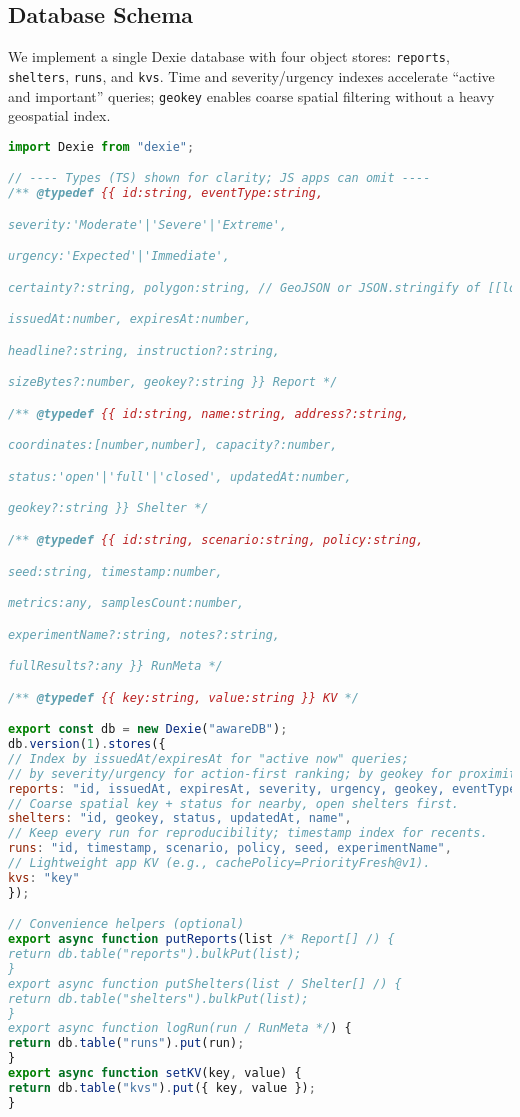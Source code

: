 \documentclass[11pt,twocolumn]{article}
\begin{document}
\subsection{Database Schema}
We implement a single Dexie database with four object stores: \texttt{reports}, \texttt{shelters}, \texttt{runs}, and \texttt{kvs}. Time and severity/urgency indexes accelerate “active and important” queries; \texttt{geokey} enables coarse spatial filtering without a heavy geospatial index.

\begin{lstlisting}[language=JavaScript, caption=AWARE EAS Database Schema Implementation]
import Dexie from "dexie";

// ---- Types (TS) shown for clarity; JS apps can omit ----
/** @typedef {{ id:string, eventType:string,

severity:'Moderate'|'Severe'|'Extreme',

urgency:'Expected'|'Immediate',

certainty?:string, polygon:string, // GeoJSON or JSON.stringify of [[lon,lat],...]

issuedAt:number, expiresAt:number,

headline?:string, instruction?:string,

sizeBytes?:number, geokey?:string }} Report */

/** @typedef {{ id:string, name:string, address?:string,

coordinates:[number,number], capacity?:number,

status:'open'|'full'|'closed', updatedAt:number,

geokey?:string }} Shelter */

/** @typedef {{ id:string, scenario:string, policy:string,

seed:string, timestamp:number,

metrics:any, samplesCount:number,

experimentName?:string, notes?:string,

fullResults?:any }} RunMeta */

/** @typedef {{ key:string, value:string }} KV */

export const db = new Dexie("awareDB");
db.version(1).stores({
// Index by issuedAt/expiresAt for "active now" queries;
// by severity/urgency for action-first ranking; by geokey for proximity.
reports: "id, issuedAt, expiresAt, severity, urgency, geokey, eventType",
// Coarse spatial key + status for nearby, open shelters first.
shelters: "id, geokey, status, updatedAt, name",
// Keep every run for reproducibility; timestamp index for recents.
runs: "id, timestamp, scenario, policy, seed, experimentName",
// Lightweight app KV (e.g., cachePolicy=PriorityFresh@v1).
kvs: "key"
});

// Convenience helpers (optional)
export async function putReports(list /* Report[] /) {
return db.table("reports").bulkPut(list);
}
export async function putShelters(list / Shelter[] /) {
return db.table("shelters").bulkPut(list);
}
export async function logRun(run / RunMeta */) {
return db.table("runs").put(run);
}
export async function setKV(key, value) {
return db.table("kvs").put({ key, value });
}
\end{lstlisting}
\end{document}
